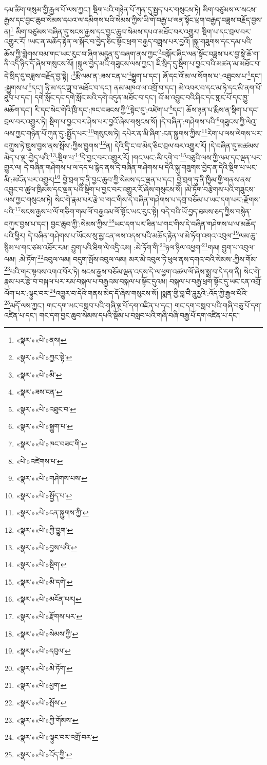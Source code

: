 དམ་ཚིག་གསུམ་གྱི་རྒྱལ་པོ་ལས་ཀྱང་། སྡིག་པའི་གཉེན་པོ་ཀུན་དུ་སྤྱད་པར་གསུངས་ཏེ། མིག་བཙུམས་ལ་སངས་རྒྱས་དང་བྱང་ཆུབ་སེམས་དཔའ་ལ་དམིགས་པའི་སེམས་ཀྱིས་ཡི་གེ་བརྒྱ་པ་ལན་སྟོང་ཕྲག་བརྒྱད་བཟླས་བརྗོད་བྱས་ན།\footnote{«སྣར་»«པེ་»ནས།} མིག་བཙུམས་བཞིན་དུ་སངས་རྒྱས་དང་བྱང་ཆུབ་སེམས་དཔའ་མཐོང་བར་འགྱུར། སྡིག་པ་དང་བྲལ་བར་འགྱུར་རོ། །ཡང་ན་མཆོད་རྟེན་ལ་སྐོར་བ་བྱེད་ཅིང་སྟོང་ཕྲག་བརྒྱད་བཟླས་པར་བྱའོ། །སྐུ་གཟུགས་དང་དམ་པའི་ཆོས་ཀྱི་གླེགས་བམ་གང་ཡང་རུང་བ་ཞིག་མདུན་དུ་བཞག་ནས་ཀྱང་\footnote{«སྣར་»«པེ་»ཀྱང་སྟེ་}བསྐོར་ཞིང་ལན་སྟོང་བཟླས་པར་བྱ་སྟེ་ཆོ་ག་ནི་འདི་ཉིད་དོ་ཞེས་གསུངས་སོ། །སྐུལ་བྱེད་མའི་གཟུངས་ལས་ཀྱང་། ཇི་སྲིད་དུ་སྡིག་པ་བྱང་བའི་མཚན་མ་མཐོང་བ་དེ་སྲིད་དུ་བཟླས་བརྗོད་བྱ་སྟེ། :\footnote{«སྣར་»«པེ་»མི་}རྨི་ལམ་ན་:ཟས་ངན་པ་\footnote{«སྣར་»ཟས་ངན་}སྐྱུག་པ་དང་། ཞོ་དང་འོ་མ་ལ་སོགས་པ་:འཐུངས་པ་\footnote{«སྣར་»«པེ་»འཐུང་བ་}དང་། :སྐྱུགས་པ་\footnote{«སྣར་»«པེ་»སྐྱུག་པ་}དང་། ཉི་མ་དང་ཟླ་བ་མཐོང་བ་དང་། ནམ་མཁའ་ལ་འགྲོ་བ་དང་། མེ་འབར་བ་དང་མ་ཧེ་དང་མི་ནག་པོ་ཐུབ་པ་དང་། དགེ་སློང་དང་དགེ་སློང་མའི་དགེ་འདུན་མཐོང་བ་དང་། འོ་མ་འབྱུང་བའི་ཤིང་དང་གླང་པོ་དང་ཁྱུ་མཆོག་དང་། རི་དང་སེང་གེའི་ཁྲི་དང་:ཁང་བཟངས་ཀྱི་\footnote{«སྣར་»«པེ་»ཁང་བཟང་གི་}སྟེང་དུ་:འཛེག་པ་\footnote{«པེ་»འཛེགས་པ་}དང་། ཆོས་ཉན་པ་རྨིས་ན་སྡིག་པ་དང་བྲལ་བར་འགྱུར་ཏེ། སྡིག་པ་བྱང་བར་ཤེས་པར་བྱའོ་ཞེས་གསུངས་སོ། །དེ་བཞིན་:གཤེགས་པའི་\footnote{«སྣར་»«པེ་»གཤེགས་པས་}གཟུངས་ཀྱི་ལེའུ་ལས་ཀྱང་གཉེན་པོ་ཀུན་དུ་:སྤྱོད་པར་\footnote{«སྣར་»«པེ་»སྤྱོད་པ་}གསུངས་ཏེ། དཔེར་ན་མི་ཞིག་:ངན་སྐྱུགས་ཀྱིས་\footnote{«སྣར་»«པེ་»ངན་སྐྱུགས་ཀྱི་}རེག་པ་ལས་ལེགས་པར་བཀྲུས་ཏེ་ཁྲུས་བྱས་ནས་སྤོས་:ཀྱིས་བྱུགས་\footnote{«སྣར་»«པེ་»ཀྱི་བྱུག་}ན། དེའི་དྲི་ང་བ་མེད་ཅིང་བྲལ་བར་འགྱུར་རོ། །དེ་བཞིན་དུ་མཚམས་མེད་པ་ལྔ་:བྱེད་པའི་\footnote{«སྣར་»«པེ་»བྱས་པའི་}:སྡིག་པ་\footnote{«སྣར་»«པེ་»སྡིག་}དེ་བྱང་བར་འགྱུར་རོ། །གང་ཡང་:མི་དགེ་བ་\footnote{«སྣར་»«པེ་»མི་དགེ་}བཅུའི་ལས་ཀྱི་ལམ་དང་ལྡན་པར་གྱུར་ལ། དེ་བཞིན་གཤེགས་པ་ལ་དད་པ་རྙེད་ནས་དེ་བཞིན་གཤེགས་པ་དེའི་སྐུ་གཟུགས་བྱེད་ན་དེའི་སྡིག་པ་ཡང་མི་:མངོན་པར་འགྱུར།\footnote{«སྣར་»«པེ་»མངོན་པར།} བྱེ་བྲག་ཏུ་ནི་བྱང་ཆུབ་ཀྱི་སེམས་དང་ལྡན་པ་དང་། བྱེ་བྲག་ཏུ་ནི་ཁྱིམ་གྱི་གནས་ནས་འབྱུང་བ་ཚུལ་ཁྲིམས་དང་ལྡན་པའི་སྡིག་པ་བྱང་བར་འགྱུར་རོ་ཞེས་གསུངས་སོ། །མེ་ཏོག་བརྩེགས་པའི་གཟུངས་ལས་ཀྱང་གསུངས་ཏེ། སེང་གེ་རྣམ་པར་རྩེ་བ་གང་གིས་དེ་བཞིན་གཤེགས་པ་དགྲ་བཅོམ་པ་ཡང་དག་པར་:རྫོགས་པའི་\footnote{«སྣར་»«པེ་»རྫོགས་པར་}སངས་རྒྱས་པ་ལོ་གཅིག་གམ་ལོ་བརྒྱའམ་ལོ་སྟོང་ཡང་རུང་སྟེ། བདེ་བའི་ཡོ་བྱད་ཐམས་ཅད་ཀྱིས་བསྙེན་བཀུར་བྱས་པ་དང་། བྱང་ཆུབ་ཀྱི་:སེམས་ཀྱིས་\footnote{«སྣར་»«པེ་»སེམས་ཀྱི་}ཡང་དག་པར་ཟིན་པ་གང་གིས་དེ་བཞིན་གཤེགས་པ་ལ་མཆོད་པའི་ཕྱིར། དེ་བཞིན་གཤེགས་པ་ཡོངས་སུ་མྱ་ངན་ལས་འདས་པའི་མཆོད་རྟེན་ལ་མེ་ཏོག་འགའ་འབུལ་\footnote{«སྣར་»«པེ་»དབུལ་}ལམ་ཆུ་སྙིམ་པ་གང་ཙམ་འཐོར་རམ། བྱུག་པའི་ཐིག་ལེ་འདྲི་འམ། :མེ་ཏོག་གི་\footnote{«སྣར་»«པེ་»མེ་ཏོག་}ཉལ་ཉིལ་འཕྱག་\footnote{«སྣར་»«པེ་»ཕྱག་}གམ། བྱུག་པ་འབུལ་ལམ། :མེ་ཏོག་\footnote{«སྣར་»«པེ་»སྤོས་}འབུལ་ལམ། བདུག་སྤོས་འབུལ་ལམ། མར་མེ་འབུལ་ཏེ་ཕུལ་ནས་དགའ་བའི་སེམས་:ཀྱིས་གོམ་\footnote{«སྣར་»«པེ་»ཀྱི་གོམས་}པའི་གར་སྟབས་འགའ་བོར་ཏེ། སངས་རྒྱས་བཅོམ་ལྡན་འདས་དེ་ལ་ཕྱག་འཚལ་ལོ་ཞེས་སྨྲ་བ་དེ་དག་ནི། སེང་གེ་རྣམ་པར་རྩེ་བ་བསྐལ་པར་རམ་བསྐལ་པ་བརྒྱའམ་བསྐལ་པ་སྟོང་དུའམ། བསྐལ་པ་བརྒྱ་ཕྲག་སྟོང་དུ་ཡང་ངན་འགྲོ་ལོག་པར་:ལྟུང་བར་\footnote{«སྣར་»«པེ་»ལྟུང་བར་འགྲོ་བར་}འགྱུར་བ་དེའི་གནས་མེད་དོ་ཞེས་གསུངས་སོ། །སྨན་གྱི་བླ་བཻ་ཌཱུརྱའི་:འོད་ཀྱི་རྒྱལ་པོའི་\footnote{«སྣར་»«པེ་»འོད་ཀྱི་}མདོ་ལས་ཀྱང་། གང་དག་ཡང་བསླབ་པའི་གཞི་ལྔ་པོ་དག་འཛིན་པ་དང་། གང་དག་བསླབ་པའི་གཞི་བཅུ་པོ་དག་འཛིན་པ་དང་། གང་དག་བྱང་ཆུབ་སེམས་དཔའི་སྡོམ་པ་བསླབ་པའི་གཞི་བཞི་བརྒྱ་པོ་དག་འཛིན་པ་དང་། 
